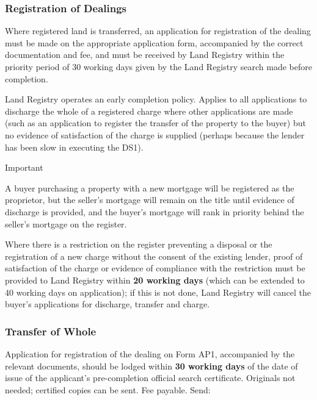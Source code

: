 \documentclass[
]{article}
\newenvironment{env-52ef4df6-0247-4add-808f-4f9dc78a480a}
{
    \savenotes\tcolorbox[blanker,breakable,left=5pt,borderline west={2pt}{-4pt}{cyan}]
}
{
    \endtcolorbox\spewnotes
}
\begin{document}
\hypertarget{registration-of-dealings}{%
\subsubsection{Registration of
Dealings}\label{registration-of-dealings}}

Where registered land is transferred, an application for registration of
the dealing must be made on the appropriate application form,
accompanied by the correct documentation and fee, and must be received
by Land Registry within the priority period of 30 working days given by
the Land Registry search made before completion.

Land Registry operates an early completion policy. Applies to all
applications to discharge the whole of a registered charge where other
applications are made (such as an application to register the transfer
of the property to the buyer) but no evidence of satisfaction of the
charge is supplied (perhaps because the lender has been slow in
executing the DS1).

\begin{env-52ef4df6-0247-4add-808f-4f9dc78a480a}

Important

A buyer purchasing a property with a new mortgage will be registered as
the proprietor, but the seller's mortgage will remain on the title until
evidence of discharge is provided, and the buyer's mortgage will rank in
priority behind the seller's mortgage on the register.

\end{env-52ef4df6-0247-4add-808f-4f9dc78a480a}

Where there is a restriction on the register preventing a disposal or
the registration of a new charge without the consent of the existing
lender, proof of satisfaction of the charge or evidence of compliance
with the restriction must be provided to Land Registry within \textbf{20
working days} (which can be extended to 40 working days on application);
if this is not done, Land Registry will cancel the buyer's applications
for discharge, transfer and charge.

\hypertarget{transfer-of-whole}{%
\subsubsection{Transfer of Whole}\label{transfer-of-whole}}

Application for registration of the dealing on Form AP1, accompanied by
the relevant documents, should be lodged within \textbf{30 working days}
of the date of issue of the applicant's pre-completion official search
certificate. Originals not needed; certified copies can be sent. Fee
payable. Send:
\end{document}
